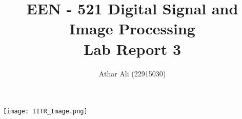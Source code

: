 \documentclass{article}
\title{\bf{\LARGE EEN - 521 Digital Signal and Image Processing\\  Lab Report 3}}
\begin{document}
	\maketitle
	\thispagestyle{fancy}
	\begin{center}
		\author{\LARGE Athar Ali (22915030)}
	\end{center}
	
	\begin{center}
		\texttt{[image: IITR\_Image.png]}
	\end{center}
\end{document}
